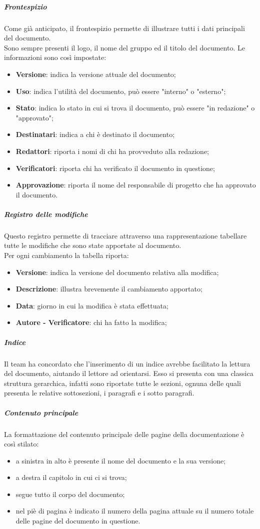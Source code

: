 \subparagraph{Frontespizio}
Come già anticipato, il frontespizio permette di illustrare tutti i dati principali del documento.\\
Sono sempre presenti il logo, il nome del gruppo ed il titolo del documento.
Le informazioni sono così impostate:
\begin{itemize}
    \item\textbf{Versione}: indica la versione attuale del documento;
    \item\textbf{Uso}: indica l'utilità del documento, può essere "interno" o "esterno";
    \item\textbf{Stato}: indica lo stato in cui si trova il documento, può essere "in redazione" o "approvato";
    \item\textbf{Destinatari}: indica a chi è destinato il documento;
    \item\textbf{Redattori}: riporta i nomi di chi ha provveduto alla redazione;
    \item\textbf{Verificatori}: riporta chi ha verificato il documento in questione;
    \item\textbf{Approvazione}: riporta il nome del responsabile di progetto che ha approvato il documento.
\end{itemize}

\subparagraph{Registro delle modifiche}
Questo registro permette di tracciare attraverso una rappresentazione tabellare tutte le modifiche che sono state apportate al documento. \\
Per ogni cambiamento la tabella riporta:
\begin{itemize}
    \item\textbf{Versione}: indica la versione del documento relativa alla modifica;
    \item\textbf{Descrizione}: illustra brevemente il cambiamento apportato;
    \item\textbf{Data}: giorno in cui la modifica è stata effettuata;
    \item\textbf{Autore - Verificatore}: chi ha fatto la modifica;
\end{itemize}

\subparagraph{Indice}
Il team ha concordato che l'inserimento di un indice avrebbe facilitato la lettura del documento, aiutando il lettore ad orientarsi.
Esso si presenta con una classica struttura gerarchica, infatti sono riportate tutte le sezioni, ognuna delle quali presenta le relative sottosezioni, i paragrafi e i sotto paragrafi.

\subparagraph{Contenuto principale}
La formattazione del contenuto principale delle pagine della documentazione è così stilato:
\begin{itemize}
    \item a sinistra in alto è presente il nome del documento e la sua versione;
    \item a destra il capitolo in cui ci si trova;
    \item segue tutto il corpo del documento;
    \item nel piè di pagina è indicato il numero della pagina attuale su il numero totale delle pagine del documento in questione.
\end{itemize}


